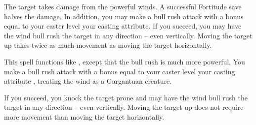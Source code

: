 \spellrng{\rngmed}
\begin{spelleffect}
  The target takes damage from the powerful winds. A successful Fortitude save halves the damage. In addition, you may make a bull rush attack with a bonus equal to your caster level \add your casting attribute. If you succeed, you may have the wind bull rush the target in any direction -- even vertically. Moving the target up takes twice as much movement as moving the target horizontally.
\end{spelleffect}

\begin{spelleffect}
  This spell functions like , except that the bull rush is much more powerful. You make a bull rush attack with a bonus equal to your caster level \add your casting attribute , treating the wind as a Gargantuan creature.
  
  If you succeed, you knock the target prone and may have the wind bull rush the target in any direction -- even vertically. Moving the target up does not require more movement than moving the target horizontally.
\end{spelleffect}

